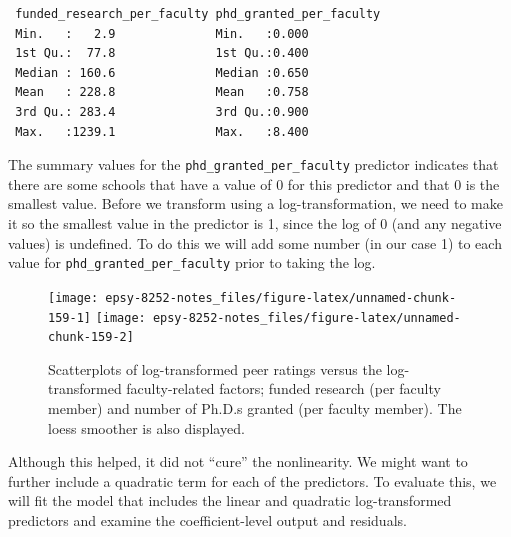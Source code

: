 \documentclass[]{book}
\newenvironment{Shaded}{\begin{snugshade}}{\end{snugshade}}
\newcommand{\CommentTok}[1]{\textcolor[rgb]{0.56,0.35,0.01}{\textit{#1}}}
\newcommand{\DataTypeTok}[1]{\textcolor[rgb]{0.13,0.29,0.53}{#1}}
\newcommand{\DecValTok}[1]{\textcolor[rgb]{0.00,0.00,0.81}{#1}}
\newcommand{\KeywordTok}[1]{\textcolor[rgb]{0.13,0.29,0.53}{\textbf{#1}}}
\newcommand{\NormalTok}[1]{#1}
\newcommand{\OperatorTok}[1]{\textcolor[rgb]{0.81,0.36,0.00}{\textbf{#1}}}
\newcommand{\StringTok}[1]{\textcolor[rgb]{0.31,0.60,0.02}{#1}}
\begin{document}
\begin{verbatim}
 funded_research_per_faculty phd_granted_per_faculty
 Min.   :   2.9              Min.   :0.000          
 1st Qu.:  77.8              1st Qu.:0.400          
 Median : 160.6              Median :0.650          
 Mean   : 228.8              Mean   :0.758          
 3rd Qu.: 283.4              3rd Qu.:0.900          
 Max.   :1239.1              Max.   :8.400          
\end{verbatim}

The summary values for the \texttt{phd\_granted\_per\_faculty} predictor indicates that there are some schools that have a value of 0 for this predictor and that 0 is the smallest value. Before we transform using a log-transformation, we need to make it so the smallest value in the predictor is 1, since the log of 0 (and any negative values) is undefined. To do this we will add some number (in our case 1) to each value for \texttt{phd\_granted\_per\_faculty} prior to taking the log.

\begin{Shaded}
\end{Shaded}

\begin{figure}

{\centering \texttt{[image: epsy-8252-notes\_files/figure-latex/unnamed-chunk-159-1]} \texttt{[image: epsy-8252-notes\_files/figure-latex/unnamed-chunk-159-2]} 

}

\caption{Scatterplots of log-transformed peer ratings versus the log-transformed faculty-related factors; funded research (per faculty member) and number of Ph.D.s granted (per faculty member). The loess smoother is also displayed.}\label{fig:unnamed-chunk-159}
\end{figure}

Although this helped, it did not ``cure'' the nonlinearity. We might want to further include a quadratic term for each of the predictors. To evaluate this, we will fit the model that includes the linear and quadratic log-transformed predictors and examine the coefficient-level output and residuals.
\end{document}
